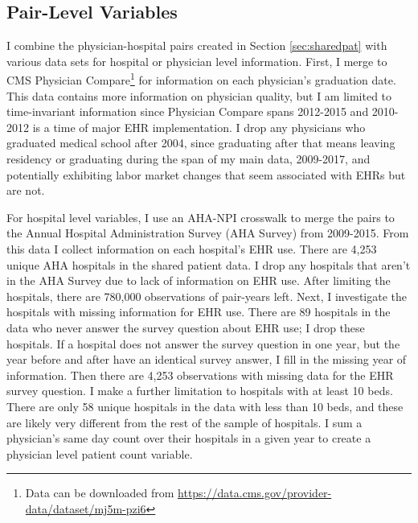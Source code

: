 \documentclass[12pt]{article}
\begin{document}
\subsection{Pair-Level Variables}

I combine the physician-hospital pairs created in Section \ref{sec:sharedpat} with various data sets for hospital or physician level information. First, I merge to CMS Physician Compare\footnote{Data can be downloaded from \hyperlink{https://data.cms.gov/provider-data/dataset/mj5m-pzi6}{https://data.cms.gov/provider-data/dataset/mj5m-pzi6}} for information on each physician's graduation date. This data contains more information on physician quality, but I am limited to time-invariant information since Physician Compare spans 2012-2015 and 2010-2012 is a time of major EHR implementation. I drop any physicians who graduated medical school after 2004, since graduating after that means leaving residency or graduating during the span of my main data, 2009-2017, and potentially exhibiting labor market changes that seem associated with EHRs but are not. 

For hospital level variables, I use an AHA-NPI crosswalk to merge the pairs to the Annual Hospital Administration Survey (AHA Survey) from 2009-2015. From this data I collect information on each hospital's EHR use. There are 4,253 unique AHA hospitals in the shared patient data. I drop any hospitals that aren't in the AHA Survey due to lack of information on EHR use. After limiting the hospitals, there are 780,000 observations of pair-years left. Next, I investigate the hospitals with missing information for EHR use. There are 89 hospitals in the data who never answer the survey question about EHR use; I drop these hospitals. If a hospital does not answer the survey question in one year, but the year before and after have an identical survey answer, I fill in the missing year of information. Then there are 4,253 observations with missing data for the EHR survey question. I make a further limitation to hospitals with at least 10 beds. There are only 58 unique hospitals in the data with less than 10 beds, and these are likely very different from the rest of the sample of hospitals. I sum a physician's same day count over their hospitals in a given year to create a physician level patient count variable. 
\end{document}
